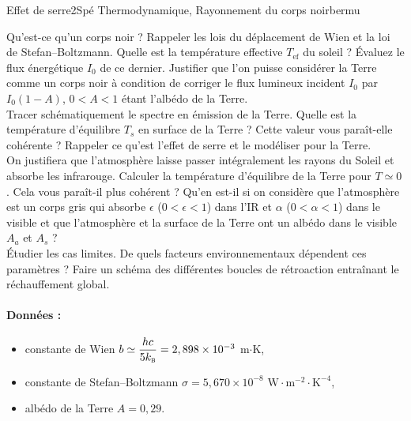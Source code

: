 

\begin{exercise}{Effet de serre}{2}{Spé}
{Thermodynamique, Rayonnement du corps noir}{bermu}

\begin{questions}
    \questioncours Qu'est-ce qu'un corps noir ? Rappeler les lois du déplacement de Wien et la loi de Stefan--Boltzmann.
    \question Quelle est la température effective $T_\text{ef}$ du soleil ? Évaluez le flux énergétique $I_0$ de ce dernier.
    \question Justifier que l'on puisse considérer la Terre comme un corps noir à condition de corriger le flux lumineux incident $I_0$ par $I_0 (1-A)$, $0<A<1$ étant l'albédo de la Terre. \\
    Tracer schématiquement le spectre en émission de la Terre.
    \question Quelle est la température d'équilibre $T_s$ en surface de la Terre ? Cette valeur vous paraît-elle cohérente ?
    \question Rappeler ce qu'est l'effet de serre et le modéliser pour la Terre. \\
    On justifiera que l'atmosphère laisse passer intégralement les rayons du Soleil et absorbe les infrarouge.
    \question Calculer la température d'équilibre de la Terre pour $T\simeq 0$. Cela vous paraît-il  plus cohérent ?
    \question Qu'en est-il si on considère que l'atmosphère est un corps gris qui absorbe $\epsilon$ ($0<\epsilon<1$) dans l'IR et $\alpha$ ($0<\alpha<1$) dans le visible et que l'atmosphère et la surface de la Terre ont un albédo dans le visible $A_a$ et $A_s$ ? \\
    \'Etudier les cas limites.
    \question De quels facteurs environnementaux dépendent ces paramètres ?
    \question Faire un schéma des différentes boucles de rétroaction entraînant le réchauffement global.


\end{questions}

\paragraph{Données :}
\begin{itemize}
    \item constante de Wien $b \simeq \dfrac{h c}{5 k_\textsc{b}} = 2,898\times 10^{-3}$ m$\cdot$K,
    \item constante de Stefan--Boltzmann $\sigma = 5,670\times 10^{-8}$ 
    $\mathrm{W\cdot m^{-2}\cdot K^{-4}}$,
    \item albédo de la Terre $A = 0,29$.
\end{itemize}
\end{exercise}